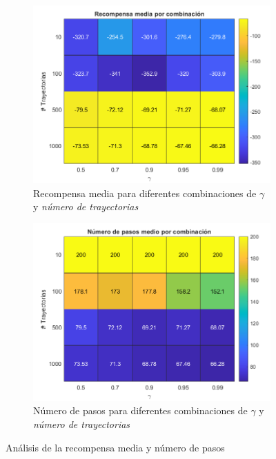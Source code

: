 \begin{figure}[H]
    \centering
    \begin{subfigure}{0.7\textwidth}
        \centering
        \includegraphics[width=\textwidth]{../../experiments/directEstimation/experiment-1/results/reward.png}
        \caption{Recompensa media para diferentes combinaciones de $\gamma$ y \textit{número de trayectorias}}
        \label{fig:directEstimation1-subfig-reward}
    \end{subfigure}
    \hfill
    \begin{subfigure}{0.7\textwidth}
        \centering
        \includegraphics[width=\textwidth]{../../experiments/directEstimation/experiment-1/results/steps.png}
        \caption{Número de pasos para diferentes combinaciones de $\gamma$ y \textit{número de trayectorias}}
        \label{fig:directEstimation1-subfig-steps}
    \end{subfigure}
    \caption{Análisis de la recompensa media y número de pasos}
    \label{fig:directEstimation1-reward}
\end{figure}


